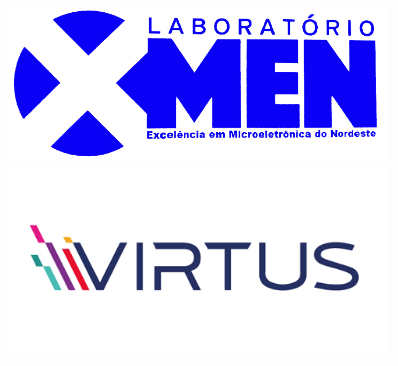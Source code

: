 \documentclass[a4paper]{article}
\begin{document}

\begin{titlepage} %
    
    
    
    
    \begin{figure}
    \centering
    \begin{minipage}{0.45\textwidth}
        \centering
        \includegraphics[width=0.9\textwidth]{logo.jpg} %
    \end{minipage}\hfill
    \begin{minipage}{0.45\textwidth}
        \centering
        \includegraphics[width=0.9\textwidth]{logo_virtus.png} %
    \end{minipage}
\end{figure}
    
    \vspace{8cm}
        \parbox[t]{0.93\textwidth}{ %
            \parbox[t]{0.91\textwidth}{ %
                \raggedleft %
                \fontsize{36pt}{40pt}\selectfont %
                \vspace{0.7cm} %
                
}}
\end{titlepage}
\end{document}
